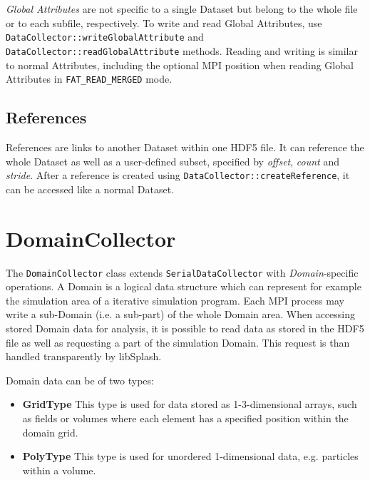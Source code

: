 \documentclass[a4paper,10pt,BCOR12mm]{report}
\begin{document}
\emph{Global Attributes} are not specific to a single Dataset but belong to the whole
file or to each subfile, respectively.
To write and read Global Attributes, use\\ \texttt{DataCollector::writeGlobalAttribute} and\\
\texttt{DataCollector::readGlobalAttribute} methods.
Reading and writing is similar to normal Attributes, including the optional MPI position
when reading Global Attributes in \texttt{FAT\_READ\_MERGED} mode.


\section{References}

References are links to another Dataset within one HDF5 file.
It can reference the whole Dataset as well as a user-defined subset, specified
by \emph{offset}, \emph{count} and \emph{stride}.
After a reference is created using \texttt{DataCollector::createReference},
it can be accessed like a normal Dataset.


\chapter{DomainCollector}

The \texttt{DomainCollector} class extends \texttt{SerialDataCollector} with \emph{Domain}-specific operations.
A Domain is a logical data structure which can represent for example the simulation area of a iterative simulation program.
Each MPI process may write a sub-Domain (i.e. a sub-part) of the whole Domain area.
When accessing stored Domain data for analysis, it is possible to read data as stored in the HDF5 file as well as requesting
a part of the simulation Domain. This request is than handled transparently by libSplash.

Domain data can be of two types:
\begin{itemize}
	\item \textbf{GridType}
	This type is used for data stored as 1-3-dimensional arrays, such as fields or volumes where each element has a specified position within the domain grid.

	\item \textbf{PolyType}
	This type is used for unordered 1-dimensional data, e.g. particles within a volume.
\end{itemize}
\end{document}
